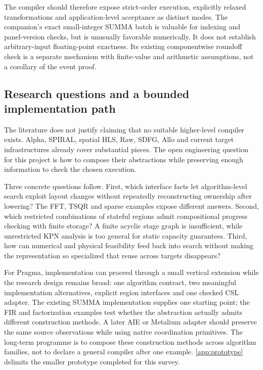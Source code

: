 \documentclass[final,3p,times,authoryear]{elsarticle}
\begin{document}
The compiler should therefore expose strict-order execution, explicitly relaxed transformations and application-level acceptance as distinct modes. The companion's exact small-integer SUMMA batch is valuable for indexing and panel-version checks, but is unusually favorable numerically. It does not establish arbitrary-input floating-point exactness. Its existing componentwise roundoff check is a separate mechanism with finite-value and arithmetic assumptions, not a corollary of the event proof.

\subsection{Research questions and a bounded implementation path}
The literature does not justify claiming that no suitable higher-level compiler exists. Alpha, SPIRAL, spatial HLS, Raw, SDFG, Allo and current target infrastructures already cover substantial pieces. The open engineering question for this project is how to compose their abstractions while preserving enough information to check the chosen execution.

Three concrete questions follow. First, which interface facts let algorithm-level search exploit layout changes without repeatedly reconstructing ownership after lowering? The FFT, TSQR and sparse examples expose different answers. Second, which restricted combinations of stateful regions admit compositional progress checking with finite storage? A finite acyclic stage graph is insufficient, while unrestricted KPN analysis is too general for static capacity guarantees. Third, how can numerical and physical feasibility feed back into search without making the representation so specialized that reuse across targets disappears?

For Pragma, implementation can proceed through a small vertical extension while the research design remains broad: one algorithm contract, two meaningful implementation alternatives, explicit region interfaces and one checked CSL adapter. The existing SUMMA implementation supplies one starting point; the FIR and factorization examples test whether the abstraction actually admits different construction methods. A later AIE or Metalium adapter should preserve the same source observations while using native coordination primitives. The long-term programme is to compose these construction methods across algorithm families, not to declare a general compiler after one example. \ref{app:prototype} delimits the smaller prototype completed for this survey.
\end{document}
